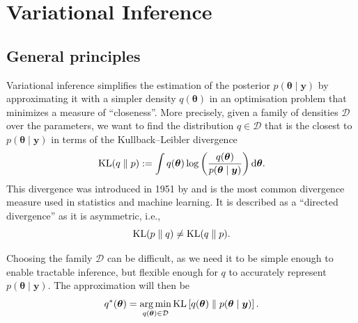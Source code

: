 \documentclass[a4paper, 11pt]{report}
\numberwithin{equation}{chapter}
\DeclareMathOperator*{\argmin}{arg\,min}
\DeclareMathOperator*{\KL}{{\rm KL}}
\begin{document}
\chapter{Variational Inference}
\section{General principles} \label{sec:gen_princ}
Variational inference simplifies the estimation of the posterior $p(\boldsymbol{\theta}\mid \boldsymbol{y})$ by approximating it with a simpler density $q(\boldsymbol{\theta})$ in an optimisation problem that minimizes a measure of ``closeness''. More precisely, given a family of densities $\mathcal{D}$ over the parameters, we want to find the distribution \mbox{$q \in \mathcal{D}$} that is the closest to $p(\boldsymbol{\theta} \mid \boldsymbol{y})$ in terms of the Kullback--Leibler divergence
\begin{equation*}
\KL(q\parallel p) := \int q(\boldsymbol{\theta})\log \left(\frac{q(\boldsymbol{\theta})}{p(\boldsymbol{\theta} \mid \boldsymbol{y})}\right) \mathrm{d}\boldsymbol{\theta}.
\end{equation*} 
This divergence was introduced in 1951 by \citet{kl51} and is the most common divergence measure used in statistics and machine learning. It is described as a ``directed divergence'' as it is asymmetric, i.e.,
$$
\KL(p\parallel q) \neq \KL(q \parallel p).
$$

Choosing the family $\mathcal{D}$ can be difficult, as we need it to be simple enough to enable tractable inference, but flexible enough for $q$ to accurately represent $p(\boldsymbol{\theta} \mid \boldsymbol{y})$. The approximation will then be
\begin{equation*}
q^*(\boldsymbol{\theta} ) = \argmin_{q(\boldsymbol{\theta}) \in \mathcal{D}} \KL\left[ q(\boldsymbol{\theta}) \parallel p(\boldsymbol{\theta} \mid \boldsymbol{y})\right].
\end{equation*}
\end{document}
